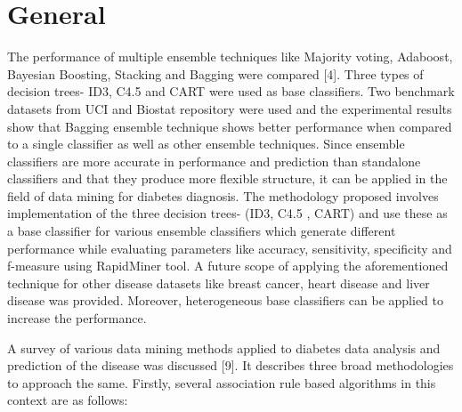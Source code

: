 \section{General}
The performance of multiple ensemble techniques like Majority voting, Adaboost, Bayesian Boosting, Stacking and Bagging were compared [4]. Three types of decision trees- ID3, C4.5 and CART were used as base classifiers. Two benchmark datasets from UCI and Biostat repository were used and the experimental results show that Bagging ensemble technique shows better performance when compared to a single classifier as well as other ensemble techniques. Since ensemble classifiers are more accurate in performance and prediction than standalone classifiers and that they produce more flexible structure, it can be applied in the field of data mining for diabetes diagnosis. The methodology proposed involves implementation of the three decision trees- (ID3, C4.5 , CART) and use these as a base classiﬁer for various ensemble classifiers which generate different performance while evaluating parameters like accuracy, sensitivity, specificity and f-measure using RapidMiner tool. A future scope of applying the aforementioned technique for other disease datasets like breast cancer, heart disease and liver disease was provided. Moreover, heterogeneous base classiﬁers can be applied to increase the performance. \par \noindent
A survey of various data mining methods applied to diabetes data analysis and prediction of the disease was discussed [9]. It describes three broad methodologies to approach the same. Firstly, several association rule based algorithms in this context are as follows:
